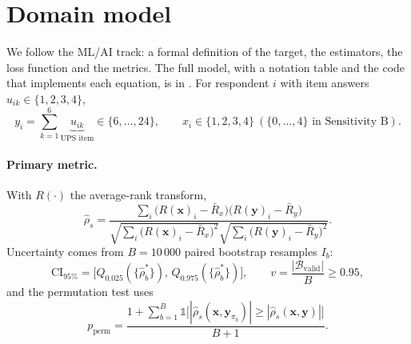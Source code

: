 \documentclass[11pt,a4paper]{article}
\begin{document}
\section{Domain model}
\label{sec:domain}
We follow the ML/AI track: a formal definition of the target, the estimators, the loss function and the metrics. The full model, with a notation table and the code that implements each equation, is in . For respondent $i$ with item answers $u_{ik}\in\{1,2,3,4\}$,
\begin{equation}
y_i = \sum_{k=1}^{6}\underbrace{u_{ik}}_{\text{UPS item}}\in\{6,\dots,24\},\qquad x_i\in\{1,2,3,4\}\ (\{0,\dots,4\}\text{ in Sensitivity B}).
\label{eq:ups}
\end{equation}

\paragraph{Primary metric.} With $R(\cdot)$ the average-rank transform,
\begin{equation}
\hat\rho_s=\frac{\sum_i\bigl(R(\mathbf x)_i-\bar R_x\bigr)\bigl(R(\mathbf y)_i-\bar R_y\bigr)}{\sqrt{\sum_i\bigl(R(\mathbf x)_i-\bar R_x\bigr)^2}\sqrt{\sum_i\bigl(R(\mathbf y)_i-\bar R_y\bigr)^2}}.
\label{eq:spearman}
\end{equation}
Uncertainty comes from $B=10\,000$ paired bootstrap resamples $I_b$:
\begin{equation}
\mathrm{CI}_{95\%}=\bigl[Q_{0.025}(\{\hat\rho^*_b\}),\,Q_{0.975}(\{\hat\rho^*_b\})\bigr],\qquad
v=\frac{|\mathcal B_{\text{valid}}|}{B}\ge0.95,
\label{eq:ci}
\end{equation}
and the permutation test uses
\begin{equation}
p_{\text{perm}}=\frac{1+\sum_{b=1}^{B}\mathbb 1\bigl[|\hat\rho_s(\mathbf x,\mathbf y_{\pi_b})|\ge|\hat\rho_s(\mathbf x,\mathbf y)|\bigr]}{B+1}.
\label{eq:perm}
\end{equation}
\end{document}
